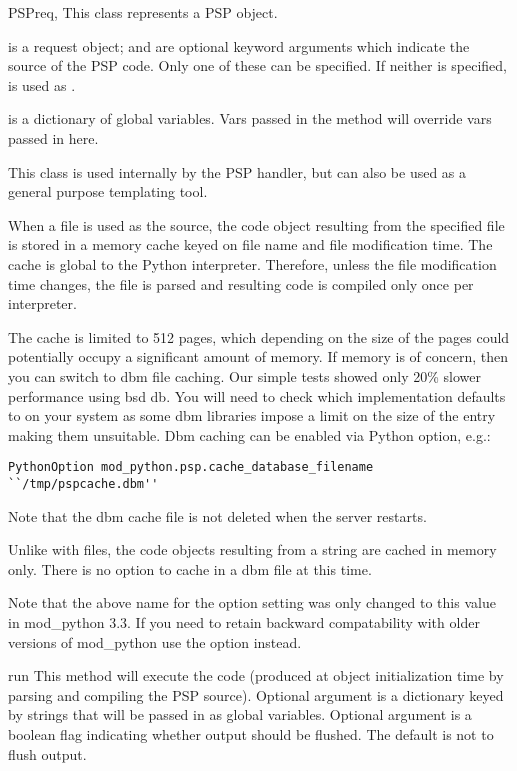 \begin{classdesc}{PSP}{req, }
  This class represents a PSP object.

   is a request object;  and  are
  optional keyword arguments which indicate the source of the PSP
  code. Only one of these can be specified. If neither is specified,
   is used as .

   is a dictionary of global variables. Vars passed in the
   method will override vars passed in here.

  This class is used internally by the PSP handler, but can also be
  used as a general purpose templating tool.

  When a file is used as the source, the code object resulting from
  the specified file is stored in a memory cache keyed on file name
  and file modification time. The cache is global to the Python
  interpreter. Therefore, unless the file modification time changes,
  the file is parsed and resulting code is compiled only once per
  interpreter.

  The cache is limited to 512 pages, which depending on the size of
  the pages could potentially occupy a significant amount of
  memory. If memory is of concern, then you can switch to dbm file
  caching. Our simple tests showed only 20\% slower performance using
  bsd db. You will need to check which implementation 
  defaults to on your system as some dbm libraries impose a limit on
  the size of the entry making them unsuitable. Dbm caching can be
  enabled via  Python
  option, e.g.:

\begin{verbatim}
PythonOption mod_python.psp.cache_database_filename ``/tmp/pspcache.dbm''
\end{verbatim}
  Note that the dbm cache file is not deleted when the server
  restarts.

  Unlike with files, the code objects resulting from a string are
  cached in memory only. There is no option to cache in a dbm file at
  this time.

  Note that the above name for the option setting was only changed to
  this value in mod_python 3.3. If you need to retain backward compatability
  with older versions of mod_python use the  option
  instead.

  \begin{methoddesc}[PSP]{run}{}
    This method will execute the code (produced at object
    initialization time by parsing and compiling the PSP
    source). Optional argument  is a dictionary keyed by
    strings that will be passed in as global variables. Optional
    argument  is a boolean flag indicating whether output
    should be flushed. The default is not to flush output.


\end{methoddesc}
\end{classdesc}
